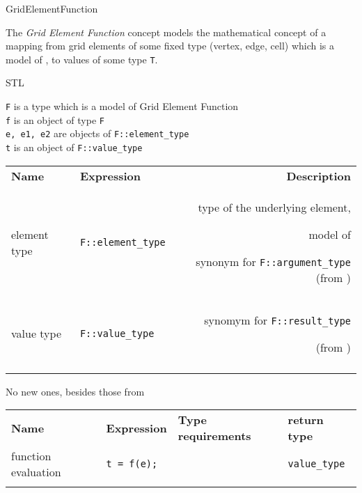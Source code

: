 \begin{Label}{GridElementFunction}
\end{Label}

The {\em Grid Element Function\/} concept 
models the mathematical concept of a mapping from
grid elements of some fixed type (vertex, edge, cell)
which is a model of ,
to values of  some type {\tt T}.

STL 

{\tt F} is a type which is a model of  Grid Element Function 
\\
{\tt f} is an object of type  {\tt F}
\\
{\tt e, e1, e2} are objects of  {\tt F::element\_type}
\\
{\tt t} is an object of  {\tt F::value\_type}


\noindent
\begin{tabularx}{14cm}{llR}  
  \T \hline
  \bf  Name  &\bf  Expression  &\bf  Description   \\ 
  \T \hline
  element type  & 
  {\tt F::element\_type} &
  type of the underlying element, 
  \par model of  
  \par synonym for {\tt F::argument\_type}
  (from )
  \\
  value type  &
  {\tt F::value\_type} &
  synomym for {\tt F::result\_type}   
  \par (from )
  \T \\   \hline  \\
\end{tabularx}
    
No new ones, besides those from 

\noindent
\begin{tabular}{llll} 
  \T \\  \hline
  \bf  Name  &\bf  Expression  &\bf  Type requirements  & \bf  return type  \\ 
  \hline
  function evaluation  &
  {\tt t = f(e);} &
  ~      &
  {\tt value\_type} 
  \T \\   \hline  \\
\end{tabular}

